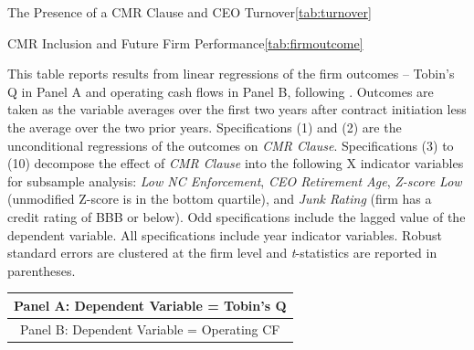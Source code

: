 \documentclass[a4paper,12pt]{article}
\begin{document}
\begin{singlespace}
\begin{papertable}{The Presence of a CMR Clause and CEO Turnover}{\ref{tab:turnover}}{}
    \startdata
    \def\arraystretch{1.1}
    
\end{papertable}



\begin{papertable}{CMR Inclusion and Future Firm Performance}{\ref{tab:firmoutcome}}{\skipline}   \label{tab:firmoutcome}

    This table reports results from linear regressions of the firm outcomes -- Tobin's Q in Panel A and operating cash flows in Panel B, following \citet{Nini_2009}.
    Outcomes are taken as the variable averages over the first two years after contract initiation less the average over the two prior years.
    Specifications (1) and (2) are the unconditional regressions of the outcomes on \textit{CMR Clause}.
    Specifications (3) to (10) decompose the effect of \textit{CMR Clause} into the following X indicator variables for subsample analysis: \textit{Low NC Enforcement}, \textit{CEO Retirement Age}, \textit{Z-score Low} (unmodified Z-score is in the bottom quartile), and \textit{Junk Rating} (firm has a credit rating of BBB or below).
    Odd specifications include the lagged value of the dependent variable.
    All specifications include year indicator variables.
    Robust standard errors are clustered at the firm level and \textit{t}-statistics are reported in parentheses.
    \postamble

    \setlength\tabcolsep{4pt}
    \startdata
    \begin{tabular}{l*{10}{c}}
        \toprule
        \multicolumn{11}{c}{\small  {Panel A}: Dependent Variable = Tobin's Q} \\
        \midrule
        
        \midrule
        \multicolumn{11}{c}{\small  {Panel B}: Dependent Variable = Operating CF} \\
        \midrule
        
        \bottomrule
    \end{tabular}
\end{papertable}




\end{singlespace}
\end{document}
